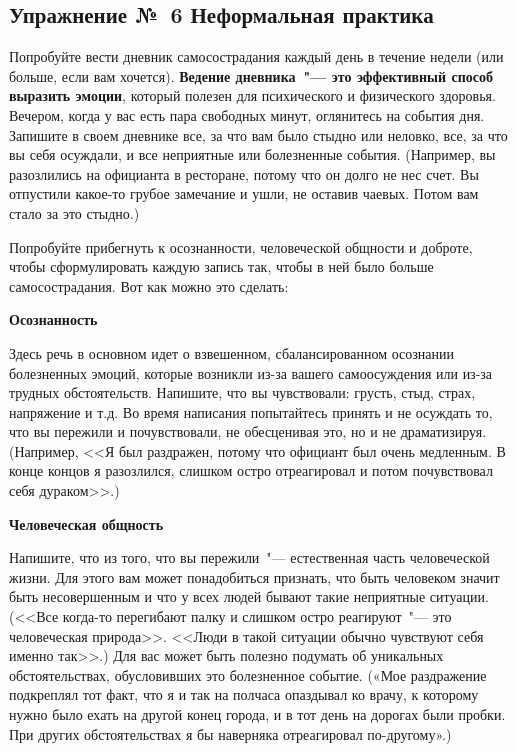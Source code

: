 \subsection{Упражнение №~6 Неформальная практика}


\vspace{3ex}

Попробуйте вести дневник самосострадания каждый день в течение недели (или больше, если вам хочется). \textbf{Ведение дневника~"--- это эффективный способ выразить эмоции}, который полезен для психического и физического здоровья.
Вечером, когда у вас есть пара свободных минут, оглянитесь на события дня. Запишите в своем дневнике все, за что вам было стыдно или неловко, все, за что вы себя осуждали, и все неприятные или болезненные события. (Например, вы разозлились на официанта в ресторане, потому что он долго не нес счет. Вы отпустили какое-то грубое замечание и ушли, не оставив чаевых. Потом вам стало за это стыдно.)

Попробуйте прибегнуть к осознанности, человеческой общности и доброте, чтобы сформулировать каждую запись так, чтобы в ней было больше самосострадания. Вот как можно это сделать:
\vspace{3ex}

\textbf{Осознанность}

Здесь речь в основном идет о взвешенном, сбалансированном осознании болезненных эмоций, которые возникли из-за вашего самоосуждения или из-за трудных обстоятельств. Напишите, что вы чувствовали: грусть, стыд, страх, напряжение и т.д. Во время написания попытайтесь принять и не осуждать то, что вы пережили и почувствовали, не обесценивая это, но и не драматизируя. (Например, <<Я был раздражен, потому что официант был очень медленным. В конце концов я разозлился, слишком остро отреагировал и потом почувствовал себя дураком>>.) 
\vspace{3ex}

\textbf{Человеческая общность}

Напишите, что из того, что вы пережили~"--- естественная часть человеческой жизни. Для этого вам может понадобиться признать, что быть человеком значит быть несовершенным и что у всех людей бывают такие неприятные ситуации. (<<Все когда-то перегибают палку и слишком остро реагируют~"--- это человеческая природа>>. <<Люди в такой ситуации обычно чувствуют себя именно так>>.) Для вас может быть полезно подумать об уникальных обстоятельствах, обусловивших это болезненное событие. («Мое раздражение подкреплял тот факт, что я и так на полчаса опаздывал ко врачу, к которому нужно было ехать на другой конец города, и в тот день на дорогах были пробки. При других обстоятельствах я бы наверняка отреагировал по-другому».) 
\vspace{3ex}

